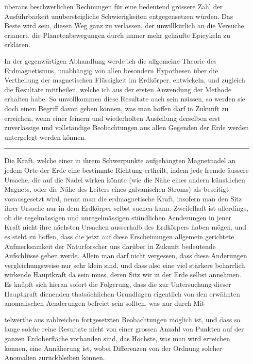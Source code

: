 \par
\clearpage
{}
\noindent überaus beschwerlichen Rechnungen für eine bedeutend grössere Zahl der Ausführbarkeit unübersteigliche Schwierigkeiten entgegensetzen würden. Das Beste wird sein, diesen Weg ganz zu verlassen, der unwillkürlich an die Versuche erinnert. die Planetenbewegungen durch immer mehr gehäufte Epicykeln zu erklären.

In der gegenwärtigen Abhandlung werde ich die allgemeine Theorie des Erdmagnetismus, unabhängig von allen besondern Hypothesen über die Vertheilung der magnetischen Flüssigkeit im Erdkörper, entwickeln, und zugleich die Resultate mittheilen, welche ich aus der ersten Anwendung der Methode erhalten habe. So unvollkommen diese Resultate auch sein müssen, so werden sie doch einen Begriff davon geben können, was man hoffen darf in Zukunft zu erreichen, wenn einer feinern und wiederholten Ausfeilung derselben erst zuverlässige und vollständige Beobachtungen aus allen Gegenden der Erde werden untergelegt werden können.

\begin{center}\rule{.22\linewidth}{.35pt}\end{center}
Die Kraft, welche einer in ihrem Schwerpunkte aufgehängten Magnetnadel an jedem Orte der Erde eine bestimmte Richtung ertheilt, indem jede fremde äussere Ursache, die auf die Nadel wirken könnte (wie die Nähe eines andern künstlichen Magnets, oder die Nähe des Leiters eines galvanischen Stroms) als beseitigt vorausgesetzt wird, nennt man die erdmagnetische Kraft, insofern man den Sitz ihrer Ursache nur in dem Erdkörper selbst suchen kann. Zweifelhaft ist allerdings, ob die regelmässigen und unregelmässigen stündlichen Aenderungen in jener Kraft nicht ihre nächsten Ursachen ausserhalb des Erdkörpers haben mögen, und es steht zu hoffen, dass die jetzt auf diese Erscheinungen allgemein gerichtete Aufmerksamkeit der Naturforscher uns darüber in Zukunft bedeutende Aufschlüsse geben werde. Allein man darf nicht vergessen, dass diese Änderungen vergleichungsweise nur sehr klein sind, und dass also eine viel stärkere beharrlich wirkende Hauptkraft da sein muss, deren Sitz wir in der Erde selbst annehmen. Es knüpft sich hieran sofort die Folgerung, dass die zur Untersuchung dieser Hauptkraft dienenden thatsächlichen Grundlagen eigentlich von den erwähnten anomalischen Aenderungen befreiet sein sollten, was nur durch Mit-\par
\clearpage
{}
\noindent telwerthe aus zahlreichen fortgesetzten Beobachtungen möglich ist, und dass so lange solche reine Resultate nicht von einer grossen Anzahl von Punkten auf der ganzen Erdoberfläche vorhanden sind, das Höchste, was man wird erreichen können, eine Annäherung ist, wobei Differenzen von der Ordnung solcher Anomalien zurückbleiben können.

